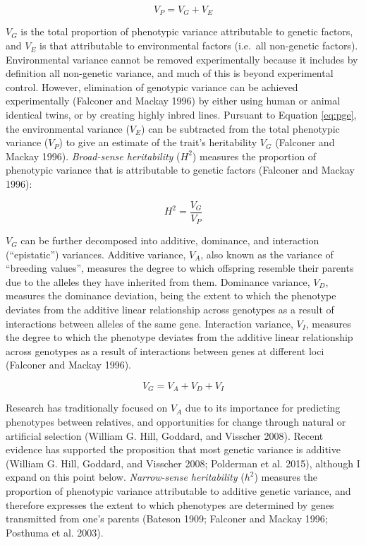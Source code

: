 \documentclass[
]{book}
\begin{document}
\begin{equation}
V_{P} = V_{G} + V_{E} \label{eq:pge}
\end{equation}

\(V_{G}\) is the total proportion of phenotypic variance attributable to genetic factors, and \(V_{E}\) is that attributable to environmental factors (i.e.~all non-genetic factors). Environmental variance cannot be removed experimentally because it includes by definition all non-genetic variance, and much of this is beyond experimental control. However, elimination of genotypic variance can be achieved experimentally (Falconer and Mackay 1996) by either using human or animal identical twins, or by creating highly inbred lines. Pursuant to Equation \eqref{eq:pge}, the environmental variance (\(V_E\)) can be subtracted from the total phenotypic variance (\(V_P\)) to give an estimate of the trait's heritability \(V_G\) (Falconer and Mackay 1996). \emph{Broad-sense heritability} (\(H^2\)) measures the proportion of phenotypic variance that is attributable to genetic factors (Falconer and Mackay 1996):

\begin{equation}
H^2 = \frac{V_G}{V_P} \label{eq:heritbs}
\end{equation}

\(V_{G}\) can be further decomposed into additive, dominance, and interaction (``epistatic'') variances. Additive variance, \(V_A\), also known as the variance of ``breeding values'', measures the degree to which offspring resemble their parents due to the alleles they have inherited from them. Dominance variance, \(V_D\), measures the dominance deviation, being the extent to which the phenotype deviates from the additive linear relationship across genotypes as a result of interactions between alleles of the same gene. Interaction variance, \(V_I\), measures the degree to which the phenotype deviates from the additive linear relationship across genotypes as a result of interactions between genes at different loci (Falconer and Mackay 1996).

\begin{equation}
V_G = V_A + V_D + V_I \label{eq:gendecomp}
\end{equation}

Research has traditionally focused on \(V_A\) due to its importance for predicting phenotypes between relatives, and opportunities for change through natural or artificial selection (William G. Hill, Goddard, and Visscher 2008). Recent evidence has supported the proposition that most genetic variance is additive (William G. Hill, Goddard, and Visscher 2008; Polderman et al. 2015), although I expand on this point below. \emph{Narrow-sense heritability} (\(h^2\)) measures the proportion of phenotypic variance attributable to additive genetic variance, and therefore expresses the extent to which phenotypes are determined by genes transmitted from one's parents (Bateson 1909; Falconer and Mackay 1996; Posthuma et al. 2003).
\end{document}
